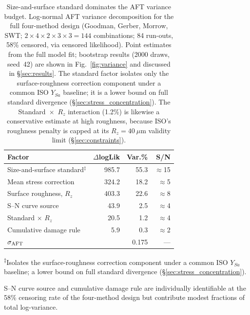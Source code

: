 \documentclass[twocolumn,12pt,a4paper]{article}
\begin{document}
\begin{table}[h]
\centering
\caption{Size-and-surface standard dominates the AFT variance budget.
Log-normal AFT variance decomposition for the full four-method design
(Goodman, Gerber, Morrow, SWT;
$2\times4\times2\times3\times3 = 144$ combinations; 84 run-outs,
58\% censored, via censored likelihood). Point estimates from the
full model fit; bootstrap results (2000 draws, seed~42) are shown
in Fig.~\ref{fig:variance} and discussed in \S\ref{sec:results}.
The standard factor isolates only the surface-roughness correction
component under a common ISO $Y_{Sa}$ baseline; it is a lower bound
on full standard divergence (\S\ref{sec:stress_concentration}). The
Standard~$\times$~$R_z$ interaction (1.2\%) is likewise a conservative
estimate at high roughness, because ISO's roughness penalty is capped
at its $R_z=40~\mu$m validity limit
(\S\ref{sec:constraints}).}
\label{tab:anova}
\footnotesize
\begin{tabular}{lrrr}
\toprule
Factor & $\Delta$logLik & Var.\% & S/N \\
\midrule
Size-and-surface standard$^\ddagger$ & 985.7 & 55.3 & $\approx$15 \\ %
Mean stress correction & 324.2 & 18.2 & $\approx$5 \\ %
Surface roughness, $R_z$    & 403.3 & 22.6 & $\approx$8 \\ %
S--N curve source      & 43.9 &  2.5 &  $\approx$4 \\ %
Standard $\times$ $R_z$     & 20.5 &  1.2 &  $\approx$4 \\ %
Cumulative damage rule &  5.9 &  0.3 &  $\approx$2 \\ %
\midrule
$\sigma_{\rm AFT}$          &        & 0.175 & --- \\
\bottomrule
\end{tabular}

\medskip\noindent\textsuperscript{$\ddagger$}Isolates the surface-roughness
correction component under a common ISO $Y_{Sa}$ baseline; a lower bound on
full standard divergence (\S\ref{sec:stress_concentration}).

\noindent S--N curve source and cumulative damage rule are individually
identifiable at the 58\% censoring rate of the four-method design but
contribute modest fractions of total log-variance.
\end{table}
\end{document}

